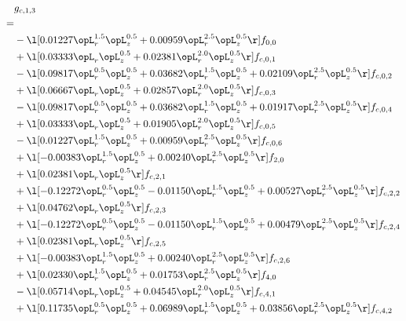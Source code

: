 \begin{alignat}{2} 
\label{eq:g_13_0} 
& g_{c,1,3} \nonumber \\ 
 = \\ 
& - \l[  0.01227 \opL_r^{1.5} \opL_z^{0.5} +  0.00959 \opL_r^{2.5} \opL_z^{0.5}  \r] f_{0,0} \nonumber \\ 
& + \l[  0.03333 \opL_r \opL_z^{0.5} +  0.02381 \opL_r^{2.0} \opL_z^{0.5}  \r] f_{c,0,1} \nonumber \\ 
& - \l[  0.09817 \opL_r^{0.5} \opL_z^{0.5} +  0.03682 \opL_r^{1.5} \opL_z^{0.5} +  0.02109 \opL_r^{2.5} \opL_z^{0.5}  \r] f_{c,0,2} \nonumber \\ 
& + \l[  0.06667 \opL_r \opL_z^{0.5} +  0.02857 \opL_r^{2.0} \opL_z^{0.5}  \r] f_{c,0,3} \nonumber \\ 
& - \l[  0.09817 \opL_r^{0.5} \opL_z^{0.5} +  0.03682 \opL_r^{1.5} \opL_z^{0.5} +  0.01917 \opL_r^{2.5} \opL_z^{0.5}  \r] f_{c,0,4} \nonumber \\ 
& + \l[  0.03333 \opL_r \opL_z^{0.5} +  0.01905 \opL_r^{2.0} \opL_z^{0.5}  \r] f_{c,0,5} \nonumber \\ 
& - \l[  0.01227 \opL_r^{1.5} \opL_z^{0.5} +  0.00959 \opL_r^{2.5} \opL_z^{0.5}  \r] f_{c,0,6} \nonumber \\ 
& + \l[  -0.00383 \opL_r^{1.5} \opL_z^{0.5} +  0.00240 \opL_r^{2.5} \opL_z^{0.5}  \r] f_{2,0} \nonumber \\ 
& + \l[  0.02381 \opL_r \opL_z^{0.5}  \r] f_{c,2,1} \nonumber \\ 
& + \l[  -0.12272 \opL_r^{0.5} \opL_z^{0.5}   -0.01150 \opL_r^{1.5} \opL_z^{0.5} +  0.00527 \opL_r^{2.5} \opL_z^{0.5}  \r] f_{c,2,2} \nonumber \\ 
& + \l[  0.04762 \opL_r \opL_z^{0.5}  \r] f_{c,2,3} \nonumber \\ 
& + \l[  -0.12272 \opL_r^{0.5} \opL_z^{0.5}   -0.01150 \opL_r^{1.5} \opL_z^{0.5} +  0.00479 \opL_r^{2.5} \opL_z^{0.5}  \r] f_{c,2,4} \nonumber \\ 
& + \l[  0.02381 \opL_r \opL_z^{0.5}  \r] f_{c,2,5} \nonumber \\ 
& + \l[  -0.00383 \opL_r^{1.5} \opL_z^{0.5} +  0.00240 \opL_r^{2.5} \opL_z^{0.5}  \r] f_{c,2,6} \nonumber \\ 
& + \l[  0.02330 \opL_r^{1.5} \opL_z^{0.5} +  0.01753 \opL_r^{2.5} \opL_z^{0.5}  \r] f_{4,0} \nonumber \\ 
& - \l[  0.05714 \opL_r \opL_z^{0.5} +  0.04545 \opL_r^{2.0} \opL_z^{0.5}  \r] f_{c,4,1} \nonumber \\ 
& + \l[  0.11735 \opL_r^{0.5} \opL_z^{0.5} +  0.06989 \opL_r^{1.5} \opL_z^{0.5} +  0.03856 \opL_r^{2.5} \opL_z^{0.5}  \r] f_{c,4,2} \nonumber \\ 

\end{alignat}
